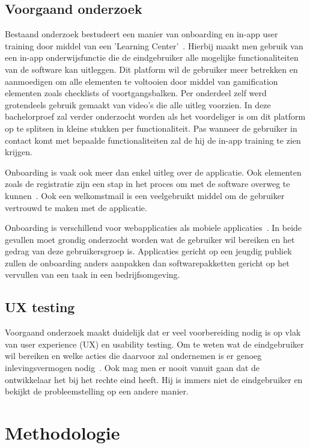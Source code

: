 \subsection{Voorgaand onderzoek}
Bestaand onderzoek bestudeert een manier van onboarding en in-app user training door middel van een 'Learning Center'~\autocite{CamachoHerrero2019}. Hierbij maakt men gebruik van een in-app onderwijsfunctie die de eindgebruiker alle mogelijke functionaliteiten van de software kan uitleggen. Dit platform wil de gebruiker meer betrekken en aanmoedigen om alle elementen te voltooien door middel van gamification elementen zoals checklists of voortgangsbalken. Per onderdeel zelf werd grotendeels gebruik gemaakt van video's die alle uitleg voorzien. In deze bachelorproef zal verder onderzocht worden als het voordeliger is om dit platform op te splitsen in kleine stukken per functionaliteit. Pas wanneer de gebruiker in contact komt met bepaalde functionaliteiten zal de hij de in-app training te zien krijgen.

Onboarding is vaak ook meer dan enkel uitleg over de applicatie. Ook elementen zoals de registratie zijn een stap in het proces om met de software overweg te kunnen~\autocite{renz2014}. Ook een welkomstmail is een veelgebruikt middel om de gebruiker vertrouwd te maken met de applicatie.

Onboarding is verschillend voor webapplicaties als mobiele applicaties~\autocite{RamirezAlvarez2018}. In beide gevallen moet grondig onderzocht worden wat de gebruiker wil bereiken en het gedrag van deze gebruikersgroep is. Applicaties gericht op een jeugdig publiek zullen de onboarding anders aanpakken dan softwarepakketten gericht op het vervullen van een taak in een bedrijfsomgeving.

\subsection{UX testing}
Voorgaand onderzoek maakt duidelijk dat er veel voorbereiding nodig is op vlak van user experience (UX) en usability testing. Om te weten wat de eindgebruiker wil bereiken en welke acties die daarvoor zal ondernemen is er genoeg inlevingsvermogen nodig~\autocite{gualtieri2009}.
Ook mag men er nooit vanuit gaan dat de ontwikkelaar het bij het rechte eind heeft. Hij is immers niet de eindgebruiker en bekijkt de probleemstelling op een andere manier.

\section{Methodologie}
\label{sec:methodologie}


